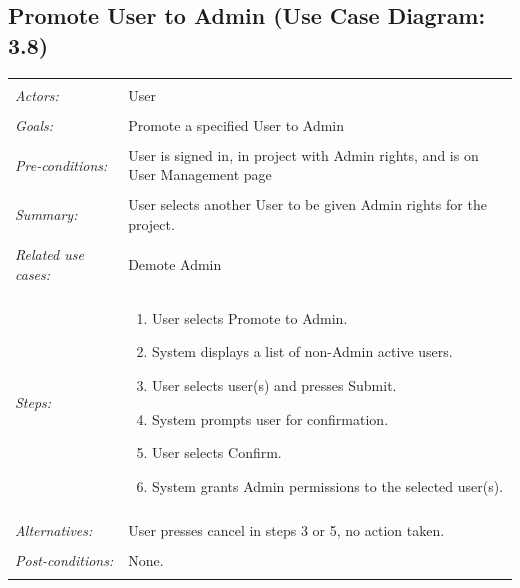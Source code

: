 \documentclass[11pt]{report}
\begin{document}
\subsection{Promote User to Admin (Use Case Diagram: 3.8)}
\begin{tabular}{ p{2cm} p{12cm} }
    \hline
    \\
    \textit{Actors:} & User \\ 
    \\
    \textit{Goals:} & Promote a specified User to Admin \\
    \\
    \textit{Pre-conditions:} & User is signed in, in project with Admin rights, and is on User Management page \\
    \\
    \textit{Summary:} & User selects another User to be given Admin rights for the project. \\ 
    \\
    \textit{Related use cases:} & Demote Admin \\ 
    \\
    \textit{Steps:} & \begin{enumerate}
        \item User selects Promote to Admin.
        \item System displays a list of non-Admin active users.
        \item User selects user(s) and presses Submit.
        \item System prompts user for confirmation.
        \item User selects Confirm.
        \item System grants Admin permissions to the selected user(s).
    \end{enumerate} \\
    \\
    \textit{Alternatives:} & User presses cancel in steps 3 or 5, no action taken. \\
    \\
    \textit{Post-conditions:} & None. \\
    \\
    \hline
\end{tabular}
\end{document}
